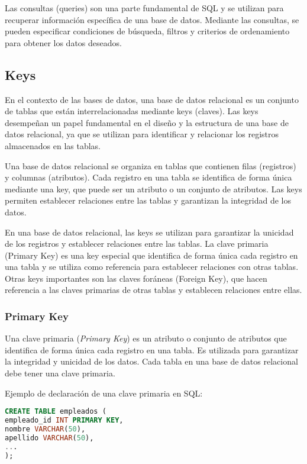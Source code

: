 \documentclass[executivepaper]{article}
\begin{document}
Las consultas (queries) son una parte fundamental de SQL y se utilizan para recuperar información específica de una base de datos. Mediante las consultas, se pueden especificar condiciones de búsqueda, filtros y criterios de ordenamiento para obtener los datos deseados.

\subsection{Keys}

En el contexto de las bases de datos, una base de datos relacional es un conjunto de tablas que están interrelacionadas mediante keys (claves). Las keys desempeñan un papel fundamental en el diseño y la estructura de una base de datos relacional, ya que se utilizan para identificar y relacionar los registros almacenados en las tablas.

Una base de datos relacional se organiza en tablas que contienen filas (registros) y columnas (atributos). Cada registro en una tabla se identifica de forma única mediante una key, que puede ser un atributo o un conjunto de atributos. Las keys permiten establecer relaciones entre las tablas y garantizan la integridad de los datos.

En una base de datos relacional, las keys se utilizan para garantizar la unicidad de los registros y establecer relaciones entre las tablas. La clave primaria (Primary Key) es una key especial que identifica de forma única cada registro en una tabla y se utiliza como referencia para establecer relaciones con otras tablas. Otras keys importantes son las claves foráneas (Foreign Key), que hacen referencia a las claves primarias de otras tablas y establecen relaciones entre ellas.

\subsubsection*{Primary Key}

Una clave primaria (\textit{Primary Key}) es un atributo o conjunto de atributos que identifica de forma única cada registro en una tabla. Es utilizada para garantizar la integridad y unicidad de los datos. Cada tabla en una base de datos relacional debe tener una clave primaria.

Ejemplo de declaración de una clave primaria en SQL:

\begin{lstlisting}[language=SQL]
CREATE TABLE empleados (
empleado_id INT PRIMARY KEY,
nombre VARCHAR(50),
apellido VARCHAR(50),
...
);
\end{lstlisting}
\end{document}
